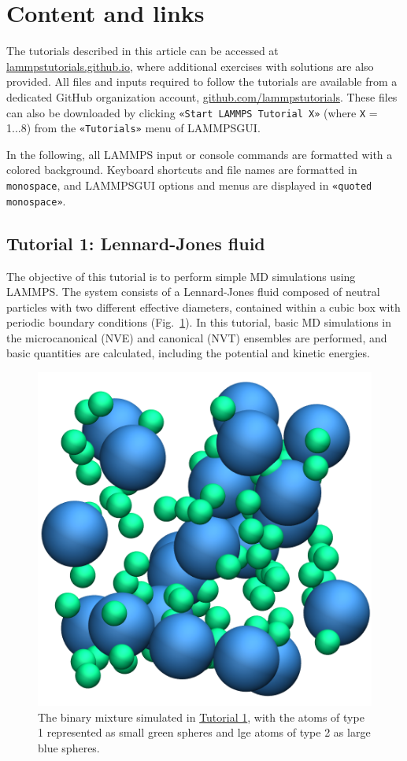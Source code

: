 \documentclass[9pt,tutorial]{livecoms}
\newcommand{\lmpcmd}[1]{\colorbox{listing}{\textcolor{command}{\small{#1}}}} %
\newcommand{\flecmd}[1]{\textcolor{command}{\texttt{#1}}} %
\newcommand{\guicmd}[1]{\textcolor{command}{\texttt{«#1»}}} %
\newcommand{\lammpsgui}{\textsf{LAMMPS\textendash GUI}}
\begin{document}
\section{Content and links}

The tutorials described in this article can be accessed at
\href{https://lammpstutorials.github.io}{lammpstutorials.github.io},
where additional exercises with solutions are also provided.  All files
and inputs required to follow the tutorials are available from a
dedicated GitHub organization account,
\href{https://github.com/lammpstutorials}{github.com/lammpstutorials}.
These files can also be downloaded by clicking \guicmd{Start LAMMPS Tutorial X}
(where \texttt{X} = 1...8) from the \guicmd{Tutorials} menu of \lammpsgui{}.

In the following, all LAMMPS input or console commands are formatted
with a \lmpcmd{colored background}.  Keyboard shortcuts and
file names are formatted in \flecmd{monospace}, and \lammpsgui{} options and menus
are displayed in \guicmd{quoted monospace}.

\subsection{Tutorial 1: Lennard-Jones fluid}
\label{lennard-jones-label}

The objective of this tutorial is to perform simple MD simulations
using LAMMPS.  The system consists of a Lennard-Jones fluid composed of
neutral particles with two different effective diameters, contained
within a cubic box with periodic boundary conditions
(Fig.~\ref{fig:LJ-avatar}).  In this tutorial, basic MD simulations in
the microcanonical (NVE) and canonical (NVT) ensembles are performed,
and basic quantities are calculated, including the potential and kinetic
energies.

\begin{figure}
\centering
\includegraphics[width=0.65\linewidth]{LJ-avatar}
\caption{The binary mixture simulated in
  \hyperref[lennard-jones-label]{Tutorial 1}, with the atoms of type 1
  represented as small green spheres and lge atoms of type 2 as large
  blue spheres.}
\label{fig:LJ-avatar}
\end{figure}
\end{document}
